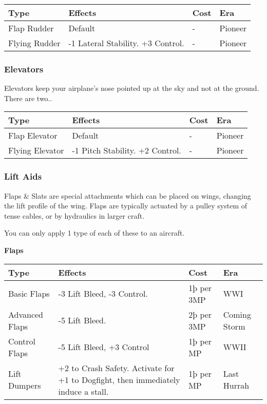 \documentclass{article}
\begin{document}
\begin{tabular}{|l|l|l|l|}
  \hline
  Type          & Effects                           & Cost & Era     \\\hline
  Flap Rudder   & Default                           & -    & Pioneer \\\hline
  Flying Rudder & -1 Lateral Stability. +3 Control. & -    & Pioneer \\\hline
\end{tabular}

\subsubsection{Elevators}
\label{_Elevators}

Elevators keep your airplane's nose pointed up at the sky and not at the
ground. There are two..

\begin{tabular}{|l|l|l|l|}
  \hline
  Type            & Effects                         & Cost & Era     \\\hline
  Flap Elevator   & Default                         & -    & Pioneer \\\hline
  Flying Elevator & -1 Pitch Stability. +2 Control. & -    & Pioneer \\\hline
\end{tabular}

\subsubsection{Lift Aids}
\label{_Lift_Aids}

Flaps \& Slats are special attachments which can be placed on wings,
changing the lift profile of the wing. Flaps are typically actuated by a
pulley system of tense cables, or by hydraulics in larger craft.

You can only apply 1 type of each of these to an aircraft.

\textbf{Flaps}

\begin{tabular}{|l|l|l|l|}
  \hline
  Type                        & Effects                                               & Cost        & Era          \\\hline
  Basic Flaps                 & -3 Lift Bleed, -3 Control.                            & 1þ per 3MP  & WWI          \\\hline
  Advanced Flaps              & -5 Lift Bleed.                                        & 2þ per 3MP  & Coming Storm \\\hline
  Control Flaps               & -5 Lift Bleed, +3 Control                             & 1þ per MP   & WWII         \\\hline
  Lift Dumpers                & +2 to Crash Safety. Activate for +1 to Dogfight, then
  immediately induce a stall. & 1þ per MP                                             & Last Hurrah                \\\hline
\end{tabular}
\end{document}
